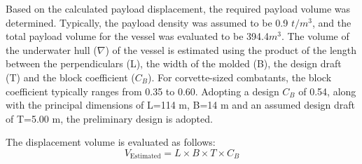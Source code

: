\documentclass[12pt,a4paper,twoside]{report}
\begin{document}
Based on the calculated payload displacement, the required payload volume was determined. Typically, the payload density was assumed to be 0.9 $t/m^{3}$, and the total payload volume for the vessel was evaluated to be 394.4$m^3$.
The volume of the underwater hull ($\nabla$) of the vessel is estimated using the product of the length between the perpendiculars (L), the width of the molded (B), the design draft (T) and the block coefficient ($C_B$). For corvette-sized combatants, the block coefficient typically ranges from 0.35 to 0.60. Adopting a design $C_B$ of 0.54, along with the principal dimensions of L=114 m, B=14 m and an assumed design draft of T=5.00 m, the preliminary design is adopted. 

    
The displacement volume is evaluated as follows:
\begin{equation}
V_{\text{Estimated}} = L \times B \times T \times C_B
\label{eq:estimated_volume}
\end{equation}
\end{document}
